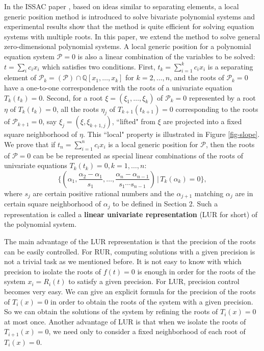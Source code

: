 \documentclass[amsthm]{JSC_LaTex_2007_Mar_12/elsart}
\def\Q{{\mathbb{Q}}}
\def\PS{ {\mathcal{P}} }
\begin{document}
In the ISSAC paper \cite{lgp-bi}, based on ideas similar to
separating elements, a local generic position method is introduced
to solve bivariate polynomial systems and experimental results show
that the method is quite efficient for solving equation systems with
multiple roots.
In this paper, we extend the method to solve general
zero-dimensional polynomial systems. A local generic position for a
polynomial equation system $\PS=0$ is also a linear combination of
the variables to be solved: $t=\sum_i c_ix_i$ which satisfies two
conditions.
First,  $t_k=\sum_{i=1}^k c_ix_i$ is a separating element of
$\mathcal{P}_k =(\mathcal{P})\cap\Q[x_1,\ldots,x_k]$ for
$k=2,\ldots,n$, and the roots of $\mathcal{P}_k=0$ have a one-to-one
correspondence with the roots of a univariate equation $T_k(t_k)=0$.
Second, for a root $\xi=(\xi_1,\ldots,\xi_k)$ of $\mathcal{P}_k=0$
represented by a root $\eta$ of $T_k(t_k)=0$, all the roots $\eta_j$
of $T_{k+1}(t_{k+1})=0$ corresponding to the roots of
$\mathcal{P}_{k+1}=0$, say $\xi_j=(\xi,\xi_{k+1,j})$, ``lifted" from
$\xi$ are projected into a fixed square neighborhood of $\eta$. This
``local" property is illustrated in Figure \ref{fig-slope}.
We prove that if $t_n=\sum_{i=1}^n c_ix_i$ is a local generic
position for $\mathcal{P}$, then the roots of $\mathcal{P}=0$ can be
be represented as special linear combinations of the roots of
univariate equations $T_k(t_k)=0,k=1,\ldots,n$:
 $$\{ (\alpha_1,\frac{\alpha_2-\alpha_1}{s_1},\ldots,\frac{\alpha_n-\alpha_{n-1}}{s_1\cdots s_{n-1}})\,|\, T_k(\alpha_k)=0 \},$$
where $s_j$ are certain positive rational numbers and the
$\alpha_{j+1}$ matching $\alpha_j$ are in certain square
neighborhood of $\alpha_j$ to be defined in Section 2.
Such a representation is called a {\bf linear univariate
representation} (LUR for short)  of the polynomial system.

The main advantage of the LUR representation is that the precision
of the roots can be easily controlled. For RUR, computing solutions
with a given precision is not a trivial task as we mentioned before.
It is not easy to know with which precision to isolate the roots of
$f(t)=0$ is enough in order for the roots of the system $x_i=R_i(t)$
to satisfy a given precision.
For LUR, precision control becomes very easy. We can give an
explicit formula for the precision of the roots of $T_i(x)=0$ in
order to obtain the roots of the system with a given precision. So
we can obtain the solutions of the system by refining the roots of
$T_i(x)=0$ at most once. Another advantage of LUR is that when we
isolate the roots of $T_{i+1}(x)=0$, we need only to consider a
fixed neighborhood of each root of $T_i(x)=0$.
\end{document}

